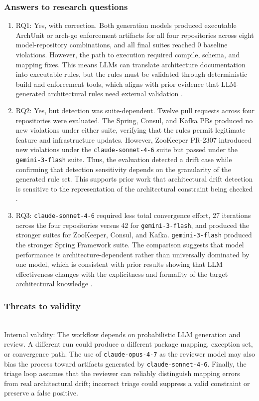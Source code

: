 \documentclass[sigconf,screen]{acmart}
\begin{document}
\subsubsection{Answers to research questions}
\begin{enumerate}
    \item RQ1: Yes, with correction. Both generation models produced executable ArchUnit or arch-go enforcement artifacts for all four repositories across eight model-repository combinations, and all final suites reached 0 baseline violations. However, the path to execution required compile, schema, and mapping fixes. This means LLMs can translate architecture documentation into executable rules, but the rules must be validated through deterministic build and enforcement tools, which aligns with prior evidence that LLM-generated architectural rules need external validation \cite{schindler2024,su2026evaluating}.
    \item RQ2: Yes, but detection was suite-dependent. Twelve pull requests across four repositories were evaluated. The Spring, Consul, and Kafka PRs produced no new violations under either suite, verifying that the rules permit legitimate feature and infrastructure updates. However, ZooKeeper PR-2307 introduced new violations under the \texttt{claude-sonnet-4-6} suite but passed under the \texttt{gemini-3-flash} suite. Thus, the evaluation detected a drift case while confirming that detection sensitivity depends on the granularity of the generated rule set. This supports prior work that architectural drift detection is sensitive to the representation of the architectural constraint being checked \cite{schindler2024,su2026evaluating}.
    \item RQ3: \texttt{claude-sonnet-4-6} required less total convergence effort, 27 iterations across the four repositories versus 42 for \texttt{gemini-3-flash}, and produced the stronger suites for ZooKeeper, Consul, and Kafka. \texttt{gemini-3-flash} produced the stronger Spring Framework suite. The comparison suggests that model performance is architecture-dependent rather than universally dominated by one model, which is consistent with prior results showing that LLM effectiveness changes with the explicitness and formality of the target architectural knowledge \cite{schindler2024,su2026evaluating}.
\end{enumerate}

\subsubsection{Threats to validity}\mbox{}\\\hspace*{\parindent}
Internal validity: The workflow depends on probabilistic LLM generation and review. A different run could produce a different package mapping, exception set, or convergence path. The use of \texttt{claude-opus-4-7} as the reviewer model may also bias the process toward artifacts generated by \texttt{claude-sonnet-4-6}. Finally, the triage loop assumes that the reviewer can reliably distinguish mapping errors from real architectural drift; incorrect triage could suppress a valid constraint or preserve a false positive.
\end{document}

